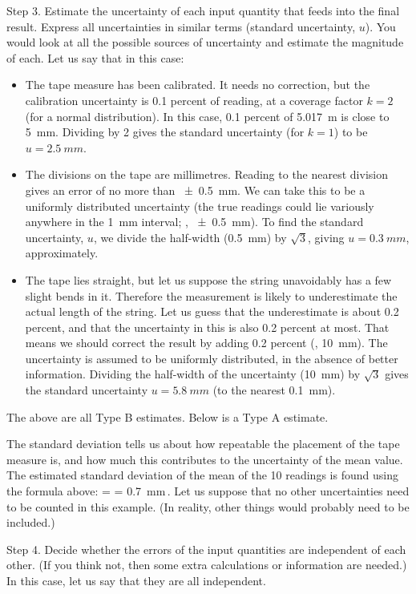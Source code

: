 Step 3. Estimate the uncertainty of each input quantity that feeds into the final result. Express all uncertainties in similar terms (standard uncertainty, $u$). You would look at all the possible sources of uncertainty and estimate the magnitude of each. Let us say that in this case:
\begin{itemize}
\item The tape measure has been calibrated. It needs no correction, but the calibration uncertainty is 0.1 percent of reading, at a coverage factor $k = 2$ (for a normal distribution). In this case, 0.1 percent of \SI{5.017}{m} is close to \SI{5}{mm}. Dividing by 2 gives the standard uncertainty (for $k = 1$) to be $u = \SI{2.5}{mm}$.
%
\item The divisions on the tape are millimetres. Reading to the nearest division gives an error of no more than \SI{+-0.5}{mm}. We can take this to be a uniformly distributed uncertainty (the true readings could lie variously anywhere in the \SI{1}{mm} interval; \ie, \SI{+-0.5}{mm}). To find the standard uncertainty, $u$, we divide the half-width (\SI{0.5}{mm}) by $\sqrt 3$, giving $u = \SI{0.3}{mm}$, approximately.
%
\item The tape lies straight, but let us suppose the string unavoidably has a few slight bends in it. Therefore the measurement is likely to underestimate the actual length of the string. Let us guess that the underestimate is about 0.2 percent, and that the uncertainty in this is also 0.2 percent at most. That means we should correct the result by adding 0.2 percent (\ie, \SI{10}{mm}). The uncertainty is assumed to be uniformly distributed, in the absence of better information. Dividing the half-width of the uncertainty (\SI{10}{mm}) by $\sqrt 3$ gives the standard uncertainty $u = \SI{5.8}{mm}$ (to the nearest \SI{0.1}{mm}).
\end{itemize}

The above are all Type B estimates. Below is a Type A estimate.

The standard deviation tells us about how repeatable the placement of the tape measure is, and how much this contributes to the uncertainty of the mean value. The estimated standard deviation of the mean of the 10 readings is found using the formula above:
\beq
{} =  = \SI{0.7}{mm}\qquad{}\,.
\eeq
Let us suppose that no other uncertainties need to be counted in this example. (In reality, other things would probably need to be included.)

Step 4. Decide whether the errors of the input quantities are independent of each other. (If you think not, then some extra calculations or information are needed.) In this case, let us say that they are all independent.

